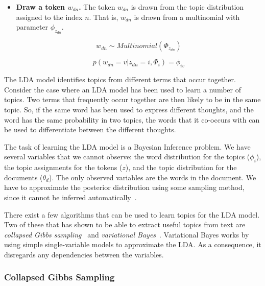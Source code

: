 \begin{itemize}
\begin{itemize}
            \item \textbf{Draw a token $w_{dn}$.}
                The token $w_{dn}$ is drawn from the topic distribution assigned to the index $n$.
                That is, $w_{dn}$ is drawn from a multinomial with parameter $\phi_{z_{dn}}$.

                \begin{equation}
                    w_{dn} \sim Multinomial(\Phi_{z_{dn}})
                \end{equation}

                \begin{equation}
                    p(w_{dn}=v|z_{dn}=i,\Phi_i) = \phi_{iv}
                \end{equation}

        \end{itemize}

\end{itemize}

The LDA model identifies topics from different terms that occur together.
Consider the case where an LDA model has been used to learn a number of topics.
Two terms that frequently occur together are then likely to be in the same topic.
So, if the same word has been used to express different thoughts, and the word has the same probability in two topics, the words that it co-occurs with can be used to differentiate between the different thoughts.

The task of learning the LDA model is a Bayesian Inference problem.
We have several variables that we cannot observe: the word distribution for the topics ($\phi_i$), the topic assignments for the tokens ($z$), and the topic distribution for the documents ($\theta_d$).
The only observed variables are the words in the document.
We have to approximate the posterior distribution using some sampling method, since it cannot be inferred automatically~\cite{blei2003latent}.

There exist a few algorithms that can be used to learn topics for the LDA model. 
Two of these that has shown to be able to extract useful topics from text are \textit{collapsed Gibbs sampling}~\cite{griffiths2004finding} and \textit{variational Bayes}~\cite{blei2003latent}.  
Variational Bayes works by using simple single-variable models to approximate the LDA\@. 
As a consequence, it disregards any dependencies between the variables.

\subsubsection{Collapsed Gibbs Sampling}

